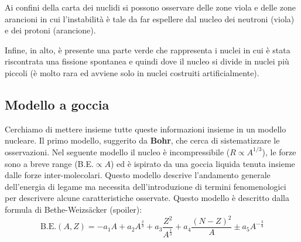 Ai confini della carta dei nuclidi si possono osservare delle zone viola e delle zone arancioni in cui l'instabilità è tale da far espellere dal nucleo dei neutroni (viola) e dei protoni (arancione). 

Infine, in alto, è presente una parte verde che rappresenta i nuclei in cui è stata riscontrata una fissione spontanea e quindi dove il nucleo si divide in nuclei più piccoli (è molto rara ed avviene solo in nuclei costruiti artificialmente).
\subsection{Modello a goccia}
Cerchiamo di mettere insieme tutte queste informazioni insieme in un modello nucleare. Il primo modello, suggerito da \textbf{Bohr}, che cerca di sistematizzare le osservazioni. Nel seguente modello il nucleo è incompressibile ($R\propto A^{1/3}$), le forze sono a breve range (B.E.$\propto A$) ed è ispirato da una goccia liquida tenuta insieme dalle forze inter-molecolari. Questo modello descrive l'andamento generale dell'energia di legame ma necessita dell'introduzione di termini fenomenologici per descrivere alcune caratteristiche osservate. Questo modello è descritto dalla formula di Bethe-Weizs\"acker (spoiler):
\begin{equation*}
    \text{B.E.}(A,Z)=-a_{1}A+a_{2}A^{\frac{2}{3}}+a_{3}{\frac {Z^2}{A^{\frac{1}{3}}}}+a_{4}{\frac {(N-Z)^{2}}{A}}\pm a_5 A^{-\frac{3}{4}}
\end{equation*}
